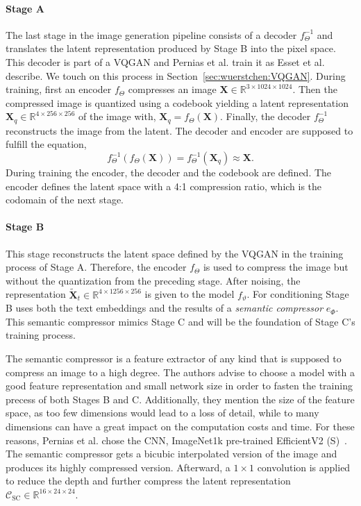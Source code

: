 \paragraph*{Stage A} The last stage in the image generation pipeline consists of a decoder
$f_{\Theta}^{-1}$ and translates the latent representation produced by Stage B into
the pixel space. This decoder is part of a VQGAN and Pernias et al. train it as
Esset et al.~\cite{esser2021tamingtransformershighresolutionimage} describe.
We touch on this process in Section~\ref{sec:wuerstchen:VQGAN}. During training,
first an encoder $f_{\Theta}$ compresses an image $\boldsymbol{X}\in\mathbb{R}^{3\times1024\times1024}$. Then the compressed image is
quantized using a codebook yielding a latent representation $\boldsymbol{X}_q\in\mathbb{R}^{4\times256\times256}$ of the image with,
$\boldsymbol{X}_q = f_{\Theta}(\boldsymbol{X}).$
Finally, the decoder $f_{\Theta}^{-1}$ reconstructs the image from the latent.
The decoder and encoder are supposed to fulfill the equation,
\begin{equation}
    f_{\Theta}^{-1}(f_{\Theta}(\boldsymbol{X})) = f_{\Theta}^{-1}(\boldsymbol{X}_q) \approx \boldsymbol{X}.
\end{equation}
During training the encoder, the decoder and the codebook are defined. The
encoder defines the latent space with a 4:1 compression ratio, which is
the codomain of the next stage.

\paragraph*{Stage B} This stage reconstructs the latent space defined by the
VQGAN in the training process of Stage A. Therefore, the encoder $f_{\Theta}$
is used to compress the image but without the quantization from the preceding stage.
After noising, the representation $\tilde{\boldsymbol{X}}_t\in\mathbb{R}^{4\times1256\times256}$
is given to the model $f_\vartheta$. For
conditioning Stage B uses both the text embeddings and the results of a
\emph{semantic compressor} $e_{\Phi}$. This semantic compressor mimics Stage C and will be
the foundation of Stage C's training process.

The semantic compressor is a feature extractor of any kind that is supposed to
compress an image to a high degree. The authors advise to choose a model with a
good feature representation and small network size in order to fasten the training
precess of both Stages B and C. Additionally, they mention the size of the
feature space, as too few dimensions would lead to a loss of detail, while to
many dimensions can have a great impact on the computation costs and time. For
these reasons, Pernias et al. chose the CNN, ImageNet1k pre-trained EfficientV2 (S)~\cite{Tan2021EfficientNetV2}.
The semantic compressor gets a bicubic interpolated version of the image and
produces its highly compressed version. Afterward, a $1\times1$ convolution is
applied to reduce the depth and further compress the latent representation $\mathcal{C}_{\text{SC}}\in\mathbb{R}^{16\times24\times24}$.


